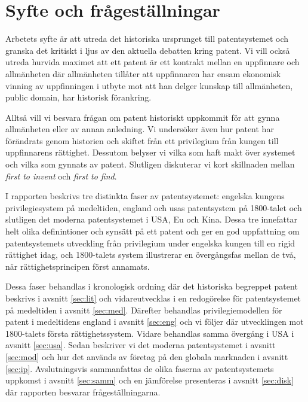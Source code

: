 \section{Syfte och frågeställningar}

Arbetets syfte är att utreda det historiska ursprunget till patentsystemet och
granska det kritiskt i ljus av den aktuella debatten kring patent.
Vi vill också utreda hurvida maximet att ett patent är ett kontrakt mellan en
uppfinnare och allmänheten där allmänheten tillåter att uppfinnaren har ensam
ekonomisk vinning av uppfinningen i utbyte mot att han delger kunskap till
allmänheten, public domain, har historisk förankring.

Alltså vill vi besvara frågan om patent historiskt uppkommit för att gynna
allmänheten eller av annan anledning. Vi undersöker även hur patent har förändrats genom historien och skiftet från ett privilegium från kungen till uppfinnarens rättighet.
Dessutom belyser vi vilka som haft makt över systemet och vilka som gynnats av patent.
Slutligen diskuterar vi kort skillnaden mellan \emph{first to invent} och \emph{first to find}.
 
I rapporten beskrivs tre distinkta faser av patentsystemet: engelska kungens privilegiesystem på medeltiden, england och usas patentsystem på 1800-talet och slutligen det moderna patentsystemet i USA, Eu och Kina. Dessa tre innefattar helt olika definintioner och synsätt på ett patent och ger en god uppfattning om patentsystemets utveckling från privilegium under engelska kungen till en rigid rättighet idag, och 1800-talets system illustrerar en övergångsfas mellan de två, när rättighetsprincipen först annamats. 

Dessa faser behandlas i kronologisk ordning där det historiska begreppet patent beskrivs i avsnitt \ref{sec:lit} och vidareutvecklas i en redogörelse för patentsystemet på medeltiden i avsnitt \ref{sec:med}. Därefter behandlas privilegiemodellen för patent i medeltidens england i avsnitt \ref{sec:eng} och vi följer där utvecklingen mot 1800-talets första rättighetssystem. Vidare behandlas samma övergång i USA i avsnitt \ref{sec:usa}. Sedan beskriver vi det moderna patentsystemet i avsnitt \ref{sec:mod} och hur det används av företag på den globala marknaden i avsnitt \ref{sec:ip}. Avslutningsvis sammanfattas de olika faserna av patentsystemets uppkomst i avsnitt \ref{sec:samm} och en jämförelse presenteras i avsnitt \ref{sec:disk} där rapporten besvarar frågeställningarna.
 
